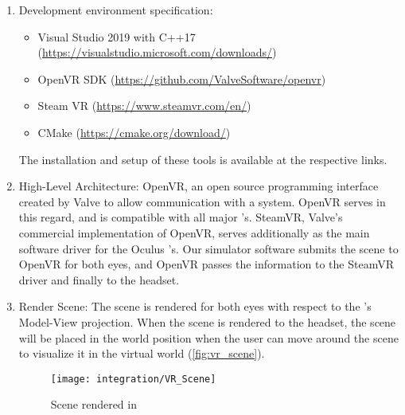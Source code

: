 \begin{enumerate}
  \item Development environment specification:
  \begin{itemize}
    \item Visual Studio 2019 with C++17 (\url{https://visualstudio.microsoft.com/downloads/})
    \item OpenVR SDK (\url{https://github.com/ValveSoftware/openvr})
    \item Steam VR (\url{https://www.steamvr.com/en/})
    \item CMake (\url{https://cmake.org/download/})
  \end{itemize}
  The installation and setup of these tools is available at the respective links.

  \item High-Level Architecture:
  OpenVR, an open source programming interface created by Valve to allow communication with a  system.  OpenVR serves in this regard, and is compatible with all major 's. SteamVR, Valve's commercial implementation of OpenVR, serves additionally as the main software driver for the Oculus 's. Our simulator software submits the scene to OpenVR for both eyes, and OpenVR passes the information to the SteamVR driver and finally to the  headset.

  \begin{center}
  \end{center}

  \item Render Scene:
  The scene is rendered for both eyes with respect to the 's Model-View projection. When the scene is rendered to the  headset, the scene will be placed in the world position when the user can move around the scene to visualize it in the virtual world (\autoref{fig:vr_scene}).

  \begin{figure}
    \centering
    \texttt{[image: integration/VR\_Scene]}
    \caption{Scene rendered in }
    \label{fig:vr_scene}
  \end{figure}


\end{enumerate}
